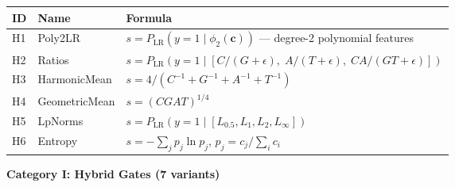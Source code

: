 \documentclass[
  11pt,
]{article}
\newcounter{none} %
\begin{document}
{\def\LTcaptype{none} %
\begin{longtable}[]{@{}
  >{\raggedright\arraybackslash}p{}
  >{\raggedright\arraybackslash}p{}
  >{\raggedright\arraybackslash}p{}@{}}
\toprule\noalign{}
\begin{minipage}[b]{\linewidth}\raggedright
ID
\end{minipage} & \begin{minipage}[b]{\linewidth}\raggedright
Name
\end{minipage} & \begin{minipage}[b]{\linewidth}\raggedright
Formula
\end{minipage} \\
\midrule\noalign{}
\endhead
\bottomrule\noalign{}
\endlastfoot
H1 & Poly2LR & \(s = P_{\text{LR}}(y=1 \mid \phi_2(\mathbf{c}))\) —
degree-2 polynomial features \\
H2 & Ratios &
\(s = P_{\text{LR}}(y=1 \mid [C/(G+\epsilon),\; A/(T+\epsilon),\; CA/(GT+\epsilon)])\) \\
H3 & HarmonicMean & \(s = 4/(C^{-1}+G^{-1}+A^{-1}+T^{-1})\) \\
H4 & GeometricMean & \(s = (CGAT)^{1/4}\) \\
H5 & LpNorms &
\(s = P_{\text{LR}}(y=1 \mid [L_{0.5}, L_1, L_2, L_\infty])\) \\
H6 & Entropy & \(s = -\sum_j p_j \ln p_j\),
\(p_j = c_j / \sum_i c_i\) \\
\end{longtable}
}

\textbf{Category I: Hybrid Gates (7 variants)}
\end{document}
